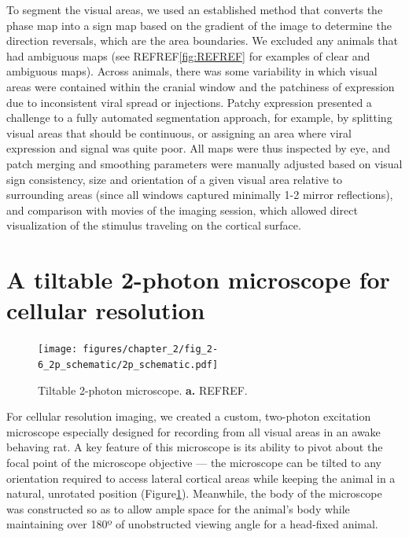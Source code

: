 To segment the visual areas, we used an established method that converts the phase map into a sign map based on the gradient of the image to determine the direction reversals, which are the area boundaries\cite{Garrett2014, Zhuang2017}. We excluded any animals that had ambiguous maps (see REFREF\ref{fig:REFREF} for examples of clear and ambiguous maps). Across animals, there was some variability in which visual areas were contained within the cranial window and the patchiness of expression due to inconsistent viral spread or injections. Patchy expression presented a challenge to a fully automated segmentation approach, for example, by splitting visual areas that should be continuous, or assigning an area where viral expression and signal was quite poor. All maps were thus inspected by eye, and patch merging and smoothing parameters were manually adjusted based on visual sign consistency, size and orientation of a given visual area relative to surrounding areas (since all windows captured minimally 1-2 mirror reflections), and comparison with movies of the imaging session, which allowed direct visualization of the stimulus traveling on the cortical surface. 

\section{A tiltable 2-photon microscope for cellular resolution}

\begin{figure}[t!]
    \texttt{[image: figures/chapter\_2/fig\_2-6\_2p\_schematic/2p\_schematic.pdf]}
    \vspace{.1in}
    \caption[Tilting two-photon microscope]{Tiltable 2-photon microscope. \textbf{a.} REFREF.
    \label{fig:2p_schematic}}
\end{figure}

For cellular resolution imaging, we created a custom, two-photon excitation microscope especially designed for recording from all visual areas in an awake behaving rat. A key feature of this microscope is its ability to pivot about the focal point of the microscope objective --- the microscope can be tilted to any orientation required to access lateral cortical areas while keeping the animal in a natural, unrotated position (Figure\ref{fig:2p_schematic}). Meanwhile, the body of the microscope was constructed so as to allow ample space for the animal's body while maintaining over 180º of unobstructed viewing angle for a head-fixed animal.


